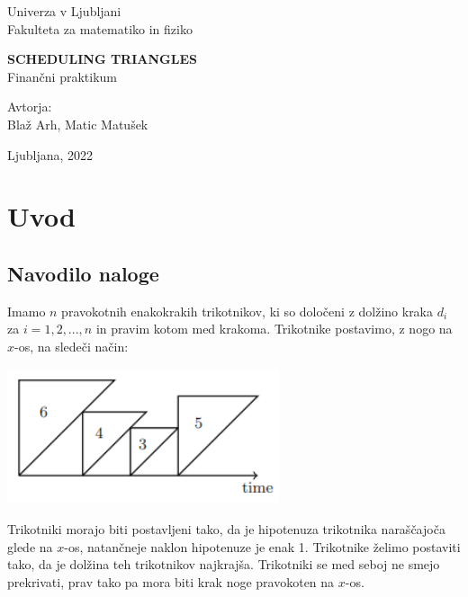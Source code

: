 \documentclass[a4paper,12pt]{article}
\theoremstyle{definition}
\theoremstyle{plain}
\begin{document}
\thispagestyle{empty}
\begin{center}
\begin{minipage}{0.75\linewidth}
    \centering
    {\Large Univerza v Ljubljani \\ Fakulteta za matematiko in fiziko}
    \\
    \vspace{7cm}

    {\uppercase{\Large \textbf{Scheduling triangles}}} \\ Finančni praktikum \\
    \vspace{5cm}

    Avtorja:\\
    { Blaž Arh, Matic Matušek}
    \vspace{5cm}

    {\Large Ljubljana, 2022}
\end{minipage}
\end{center}


\newpage
\tableofcontents
\newpage



\section{Uvod}
\subsection{Navodilo naloge}

Imamo $n$ pravokotnih enakokrakih trikotnikov, ki so določeni z dolžino kraka $d_i$ za $i=1,2,...,n$  in pravim kotom med krakoma.
Trikotnike postavimo, z nogo na $x$-os, na sledeči način:
\begin{center}
   \includegraphics[width=8cm, height=4cm]{primer_trikotnikov.png} 
\end{center}

Trikotniki morajo biti postavljeni tako, da je hipotenuza trikotnika naraščajoča glede na $x$-os, natančneje naklon hipotenuze je enak 1. 
Trikotnike želimo postaviti tako, da je dolžina teh trikotnikov najkrajša. Trikotniki se med seboj ne smejo prekrivati,
prav tako pa mora biti krak noge pravokoten na $x$-os.
\end{document}
